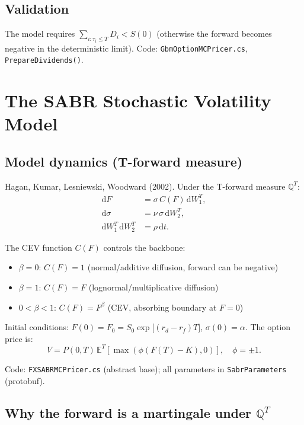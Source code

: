 \documentclass[11pt,a4paper]{article}
\newcommand{\dd}{\mathrm{d}}
\newcommand{\E}{\mathbb{E}}
\newcommand{\QT}{\mathbb{Q}^T}
\newcommand{\coderef}[1]{\texttt{\color{blue!60!black}#1}}
\theoremstyle{definition}
\begin{document}
\subsection{Validation}

The model requires $\sum_{i:\tau_i\le T}D_i < S(0)$ (otherwise the forward
becomes negative in the deterministic limit).  Code:
\coderef{GbmOptionMCPricer.cs}, \texttt{PrepareDividends()}.

\section{The SABR Stochastic Volatility Model}
\label{sec:sabr}

\subsection{Model dynamics (T-forward measure)}

Hagan, Kumar, Lesniewski, Woodward (2002).  Under the T-forward measure $\QT$:
\begin{align}
  \dd F &= \sigma\,C(F)\,\dd W_1^T, \label{eq:sabr_F}\\
  \dd\sigma &= \nu\,\sigma\,\dd W_2^T, \label{eq:sabr_sigma}\\
  \dd W_1^T\,\dd W_2^T &= \rho\,\dd t. \label{eq:sabr_corr}
\end{align}

The CEV function $C(F)$ controls the backbone:
\begin{itemize}[nosep]
  \item $\beta=0$: $C(F)=1$ (normal/additive diffusion, forward can be negative)
  \item $\beta=1$: $C(F)=F$ (lognormal/multiplicative diffusion)
  \item $0<\beta<1$: $C(F)=F^\beta$ (CEV, absorbing boundary at $F=0$)
\end{itemize}

Initial conditions: $F(0)=F_0=S_0\exp\bigl[(r_d-r_f)T\bigr]$, $\sigma(0)=\alpha$.
The option price is:
\[
  V = P(0,T)\,\E^T[\max(\phi(F(T)-K),0)],\quad\phi=\pm 1.
\]

Code: \coderef{FXSABRMCPricer.cs} (abstract base); all parameters in
\coderef{SabrParameters} (protobuf).

\subsection{Why the forward is a martingale under $\QT$}
\end{document}
